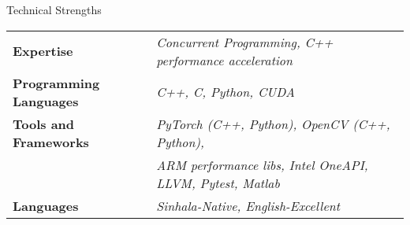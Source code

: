 \documentclass[
	11pt, %
]{./assets/resume} %
\begin{document}
	




\begin{rSection}{Technical Strengths}

	\def\arraystretch{1.5}

	\begin{tabular}{ l l}
		\textbf{Expertise} & \emph{Concurrent Programming, C++ performance acceleration} \\
		\textbf{Programming Languages} & \emph{C++, C, Python, CUDA} \\
		\textbf{Tools and Frameworks} & \emph{PyTorch (C++, Python), OpenCV (C++, Python),} \\ 
        & \emph{ARM performance libs, Intel OneAPI, LLVM, Pytest, Matlab} \\ 
		\textbf{Languages} & \emph{Sinhala-Native, English-Excellent} \\
	\end{tabular}

\end{rSection}
\end{document}
